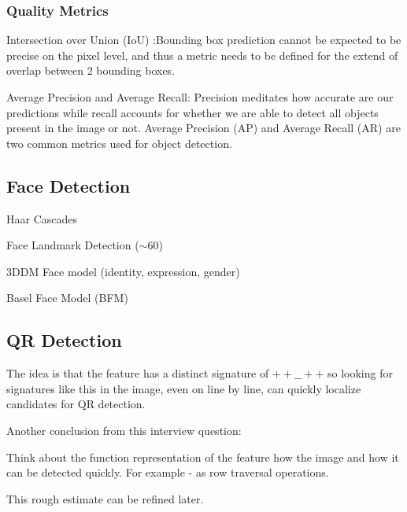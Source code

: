 \subsubsection{Quality Metrics}

Intersection over Union (IoU) :Bounding box prediction cannot be expected to be precise on the pixel level, and thus a metric needs to be defined for the extend of overlap between 2 bounding boxes.

Average Precision and Average Recall: Precision meditates how accurate are our predictions while recall accounts for whether we are able to detect all objects present in the image or not. Average Precision (AP) and Average Recall (AR) are two common metrics used for object detection.


\subsection{Face Detection}

Haar Cascades

Face Landmark Detection ($\sim 60$)

3DDM Face model (identity, expression, gender)

Basel Face Model (BFM)

\subsection{QR Detection}

The idea is that the feature has a distinct signature of $++\_\_++$ so looking for signatures like this in the image, even on line by line, can quickly localize candidates for QR detection. 

Another conclusion from this interview question: 

Think about the function representation of the feature how the image and how it can be detected quickly. For example - as row traversal operations.

This rough estimate can be refined later.

